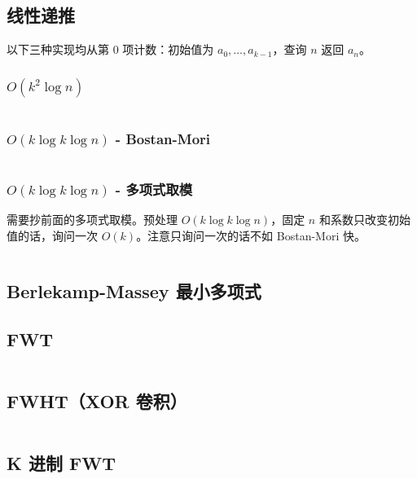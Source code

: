 					\subsection{线性递推}
						以下三种实现均从第 $0$ 项计数：初始值为 $a_0,\ldots,a_{k-1}$，查询 $n$ 返回 $a_n$。
						\subsubsection*{$O(k^2 \log n)$}
						\inputminted{cpp}{sections/Polynomial/assets/Math/线性递推.cpp}
					\subsubsection*{$O(k \log k \log n)$ - Bostan-Mori}
						\inputminted{cpp}{sections/Polynomial/assets/Math/快速线性递推-bostan-mori.cpp}
					\subsubsection*{$O(k \log k \log n)$ - 多项式取模}
						需要抄前面的多项式取模。预处理 $O(k \log k \log n)$，固定 $n$ 和系数只改变初始值的话，询问一次 $O(k)$。注意只询问一次的话不如 Bostan-Mori 快。
						\inputminted{cpp}{sections/Polynomial/assets/Math/快速线性递推-多项式取模.cpp}
				\subsection{Berlekamp-Massey 最小多项式}
					
				\subsection{FWT}
					\inputminted{cpp}{sections/Polynomial/assets/Math/FWT.cpp}
				\subsection{FWHT（XOR 卷积）}
					\inputminted{cpp}{sections/Polynomial/assets/Math/FWHT.cpp}
				\subsection{K 进制 FWT}
					\inputminted{cpp}{sections/Polynomial/assets/tbr/fwt.cpp}
